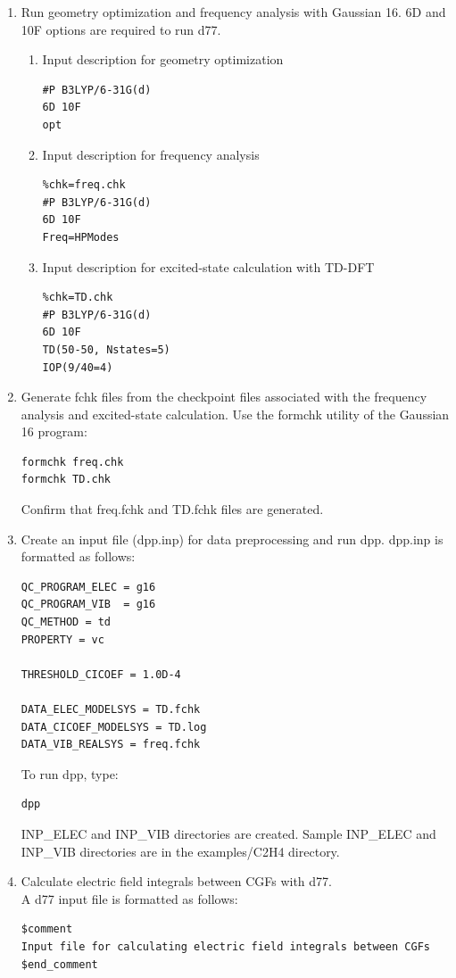 ﻿\documentclass[11pt,a4paper,openany]{article}
\begin{document}
\begin{enumerate}
\item{Run geometry optimization and frequency analysis with Gaussian 16.\cite{g16} 6D and 10F options are required to run d77.}

\begin{enumerate}
\item{Input description for geometry optimization
\begin{verbatim}
#P B3LYP/6-31G(d)
6D 10F
opt
\end{verbatim}
}

\item{Input description for frequency analysis 
\begin{verbatim}
%chk=freq.chk
#P B3LYP/6-31G(d)
6D 10F
Freq=HPModes
\end{verbatim}
}

\item{Input description for excited-state calculation with TD-DFT
\begin{verbatim}
%chk=TD.chk
#P B3LYP/6-31G(d)
6D 10F
TD(50-50, Nstates=5)
IOP(9/40=4)
\end{verbatim}
}
\end{enumerate}

\item{Generate fchk files from the checkpoint files associated with the frequency analysis and excited-state calculation.  Use the formchk utility of the Gaussian 16 program:
\begin{verbatim}
formchk freq.chk
formchk TD.chk
\end{verbatim}
}
Confirm that freq.fchk and TD.fchk files are generated.

\item{Create an input file (dpp.inp) for data preprocessing and run dpp. dpp.inp is formatted as follows:
\begin{verbatim}
QC_PROGRAM_ELEC = g16
QC_PROGRAM_VIB  = g16
QC_METHOD = td
PROPERTY = vc

THRESHOLD_CICOEF = 1.0D-4

DATA_ELEC_MODELSYS = TD.fchk
DATA_CICOEF_MODELSYS = TD.log
DATA_VIB_REALSYS = freq.fchk
\end{verbatim}
To run dpp, type:
\begin{verbatim} 
dpp
\end{verbatim}
INP\_ELEC and INP\_VIB directories are created. Sample INP\_ELEC and INP\_VIB directories are in the examples/C2H4 directory.
}

\item{Calculate electric field integrals between CGFs with d77.\\
A d77 input file is formatted as follows:
\begin{verbatim}
$comment
Input file for calculating electric field integrals between CGFs
$end_comment


\end{verbatim}}
\end{enumerate}
\end{document}
